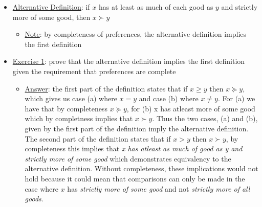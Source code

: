 \documentclass{article}
\begin{document}
  \begin{itemize}
    \item  \underline{Alternative Definition}: if $x$ has at least as much of each good as $y$ and strictly more of some good, then $x \succ y$
    \begin{itemize}
      \item  \underline{Note}: by completeness of preferences, the alternative definition implies the first definition
    \end{itemize}
    \item  \underline{Exercise 1}: prove that the alternative definition implies the first definition given the requirement that preferences are complete
    \begin{itemize}
      \item  \underline{Answer}: the first part of the definition states that if $x \geq y$ then $x \succeq y$, which gives us case (a) where $x = y$ and case (b) where $x \neq y$. For (a) we have that by completeness $x \succeq y$, for (b) x has atleast more of some good which by completness implies that $x \succ y$. Thus the two cases, (a) and (b), given by the first part of the definition imply the alternative definition. The second part of the definition states that if $x > y$ then $x \succ y$, by completeness this implies that \textit{x has atleast as much of good as y and strictly more of some good} which demonstrates equivalency to the alternative definition. Without completeness, these implications would not hold because it could mean that comparisons can only be made in the case where $x$ has \textit{strictly more of some good} and not \textit{strictly more of all goods}.
    \end{itemize}
  \end{itemize}
  \par
\vspace{6mm}
\end{document}
